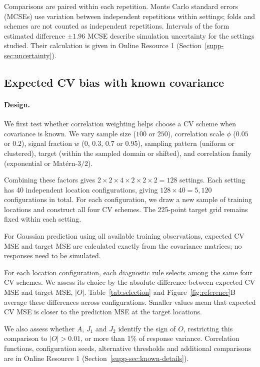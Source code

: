 Comparisons are paired within each repetition. Monte Carlo standard errors (MCSEs) use variation between independent repetitions within settings; folds and schemes are not counted as independent repetitions. Intervals of the form estimated difference $\pm1.96$ MCSE describe simulation uncertainty for the settings studied. Their calculation is given in Online Resource 1 (Section~\ref*{supp-sec:uncertainty}).

\subsection{Expected CV bias with known covariance}
\label{sec:sim-known}
\paragraph{Design.}
We first test whether correlation weighting helps choose a CV scheme when covariance is known. We vary sample size ($100$ or $250$), correlation scale $\phi$ ($0.05$ or $0.2$), signal fraction $w$ ($0$, $0.3$, $0.7$ or $0.95$), sampling pattern (uniform or clustered), target (within the sampled domain or shifted), and correlation family (exponential or Mat\'ern-$3/2$).

Combining these factors gives $2\times2\times4\times2\times2\times2=128$ settings. Each setting has 40 independent location configurations, giving $128\times40=5{,}120$ configurations in total. For each configuration, we draw a new sample of training locations and construct all four CV schemes. The 225-point target grid remains fixed within each setting.

For Gaussian prediction using all available training observations, expected CV MSE and target MSE are calculated exactly from the covariance matrices; no responses need to be simulated.

For each location configuration, each diagnostic rule selects among the same four CV schemes. We assess its choice by the absolute difference between expected CV MSE and target MSE, $|O|$. Table~\ref{tab:selection} and Figure~\ref{fig:reference}B average these differences across configurations. Smaller values mean that expected CV MSE is closer to the prediction MSE at the target locations.

We also assess whether $A$, $J_1$ and $J_2$ identify the sign of $O$, restricting this comparison to $|O|>0.01$, or more than 1\% of response variance. Correlation functions, configuration seeds, alternative thresholds and additional comparisons are in Online Resource 1 (Section~\ref*{supp-sec:known-details}).

